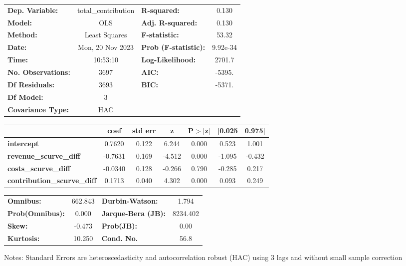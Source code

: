 \begin{center}
\begin{tabular}{lclc}
\toprule
\textbf{Dep. Variable:}             & total\_contribution & \textbf{  R-squared:         } &     0.130   \\
\textbf{Model:}                     &         OLS         & \textbf{  Adj. R-squared:    } &     0.130   \\
\textbf{Method:}                    &    Least Squares    & \textbf{  F-statistic:       } &     53.32   \\
\textbf{Date:}                      &   Mon, 20 Nov 2023  & \textbf{  Prob (F-statistic):} &  9.92e-34   \\
\textbf{Time:}                      &       10:53:10      & \textbf{  Log-Likelihood:    } &    2701.7   \\
\textbf{No. Observations:}          &          3697       & \textbf{  AIC:               } &    -5395.   \\
\textbf{Df Residuals:}              &          3693       & \textbf{  BIC:               } &    -5371.   \\
\textbf{Df Model:}                  &             3       & \textbf{                     } &             \\
\textbf{Covariance Type:}           &         HAC         & \textbf{                     } &             \\
\bottomrule
\end{tabular}
\begin{tabular}{lcccccc}
                                    & \textbf{coef} & \textbf{std err} & \textbf{z} & \textbf{P$> |$z$|$} & \textbf{[0.025} & \textbf{0.975]}  \\
\midrule
\textbf{intercept}                  &       0.7620  &        0.122     &     6.244  &         0.000        &        0.523    &        1.001     \\
\textbf{revenue\_scurve\_diff}      &      -0.7631  &        0.169     &    -4.512  &         0.000        &       -1.095    &       -0.432     \\
\textbf{costs\_scurve\_diff}        &      -0.0340  &        0.128     &    -0.266  &         0.790        &       -0.285    &        0.217     \\
\textbf{contribution\_scurve\_diff} &       0.1713  &        0.040     &     4.302  &         0.000        &        0.093    &        0.249     \\
\bottomrule
\end{tabular}
\begin{tabular}{lclc}
\textbf{Omnibus:}       & 662.843 & \textbf{  Durbin-Watson:     } &    1.794  \\
\textbf{Prob(Omnibus):} &   0.000 & \textbf{  Jarque-Bera (JB):  } & 8234.402  \\
\textbf{Skew:}          &  -0.473 & \textbf{  Prob(JB):          } &     0.00  \\
\textbf{Kurtosis:}      &  10.250 & \textbf{  Cond. No.          } &     56.8  \\
\bottomrule
\end{tabular}
\end{center}

Notes: \newline
 [1] Standard Errors are heteroscedasticity and autocorrelation robust (HAC) using 3 lags and without small sample correction